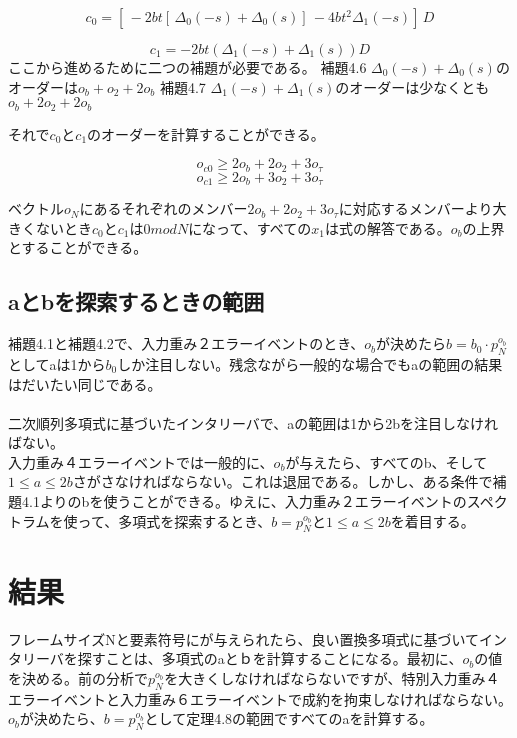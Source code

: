 \documentclass[20 pts]{article}
\begin{document}
\begin{equation}\tag{32}
c_0=\left[\,-2bt[\,\Delta_0(-s)+\Delta_0(s)]\,-4bt^2\Delta_1(-s)\right]\,D
\end{equation}

\begin{equation}\tag{33}
c_1=-2bt(\Delta_1(-s)+\Delta_1(s))D
\end{equation}
ここから進めるために二つの補題が必要である。
補題4.6
$\Delta_0 (-s)+\Delta_0 (s)$のオーダーは$o_b +o_2+2o_b$
補題4.7
$\Delta_1 (-s)+\Delta_1 (s)$のオーダーは少なくとも$o_b +2o_2+2o_b$

それで$c_0$と$c_1$のオーダーを計算することができる。

$$o_{c0}\geq2o_b+2o_2+3o_\tau$$
$$o_{c1}\geq2o_b+3o_2+3o_\tau$$

ベクトル$o_N$にあるそれぞれのメンバー$2o_b+2o_2+3o_\tau$に対応するメンバーより大きくないとき$c_0$と$c_1$は$0modN$になって、すべての$x_1$は式の解答である。$o_b$の上界とすることができる。

\subsection{aとbを探索するときの範囲}
補題4.1と補題4.2で、入力重み２エラーイベントのとき、$o_b$が決めたら$b=b_0 \cdot p_N^{o_b}$としてaは1から$b_0$しか注目しない。残念ながら一般的な場合でもaの範囲の結果はだいたい同じである。
\paragraph{}
二次順列多項式に基づいたインタリーバで、aの範囲は1から2bを注目しなければない。\\
入力重み４エラーイベントでは一般的に、$o_b$が与えたら、すべてのb、そして$1\leq a\leq 2b$さがさなければならない。これは退屈である。しかし、ある条件で補題4.1よりのbを使うことができる。ゆえに、入力重み２エラーイベントのスペクトラムを使って、多項式を探索するとき、$b=p_N^{o_b}$と$1\leq a\leq 2b$を着目する。

\section{結果}
フレームサイズNと要素符号にが与えられたら、良い置換多項式に基づいてインタリーバを探すことは、多項式のaとｂを計算することになる。最初に、$o_b$の値を決める。前の分析で$p_N^{o_b}$を大きくしなければならないですが、特別入力重み４エラーイベントと入力重み６エラーイベントで成約を拘束しなければならない。$o_b$が決めたら、$b=p_N^{o_b}$として定理4.8の範囲ですべてのaを計算する。
\end{document}
